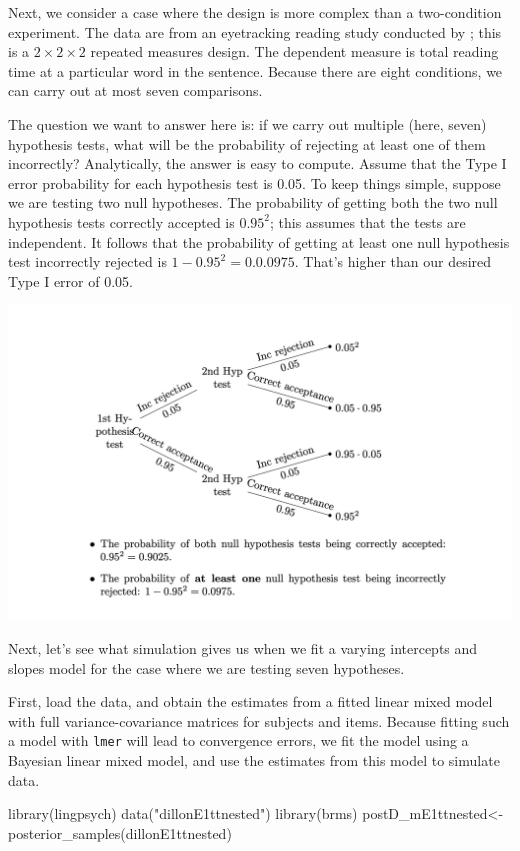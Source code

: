\documentclass[
  12pt,
]{krantz}
\newenvironment{Shaded}{\begin{snugshade}}{\end{snugshade}}
\newcommand{\FunctionTok}[1]{\textcolor[rgb]{0.00,0.00,0.00}{#1}}
\newcommand{\NormalTok}[1]{#1}
\newcommand{\OtherTok}[1]{\textcolor[rgb]{0.56,0.35,0.01}{#1}}
\newcommand{\StringTok}[1]{\textcolor[rgb]{0.31,0.60,0.02}{#1}}
\theoremstyle{definition}
\theoremstyle{definition}
\theoremstyle{definition}
\theoremstyle{definition}
\theoremstyle{remark}
\begin{document}
Next, we consider a case where the design is more complex than a two-condition experiment. The data are from an eyetracking reading study conducted by \citet{Dillon-EtAl-2013}; this is a \(2\times 2 \times 2\) repeated measures design. The dependent measure is total reading time at a particular word in the sentence. Because there are eight conditions, we can carry out at most seven comparisons.

The question we want to answer here is: if we carry out multiple (here, seven) hypothesis tests, what will be the probability of rejecting at least one of them incorrectly? Analytically, the answer is easy to compute. Assume that the Type I error probability for each hypothesis test is 0.05. To keep things simple, suppose we are testing two null hypotheses. The probability of getting both the two null hypothesis tests correctly accepted is \(0.95^2\); this assumes that the tests are independent. It follows that the probability of getting at least one null hypothesis test incorrectly rejected is \(1-0.95^2=0.0.0975\). That's higher than our desired Type I error of 0.05.

\includegraphics{figures/probspace.png}

Next, let's see what simulation gives us when we fit a varying intercepts and slopes model for the case where we are testing seven hypotheses.

First, load the data, and obtain the estimates from a fitted linear mixed model with full variance-covariance matrices for subjects and items. Because fitting such a model with \texttt{lmer} will lead to convergence errors, we fit the model using a Bayesian linear mixed model, and use the estimates from this model to simulate data.

\begin{Shaded}
\begin{Highlighting}[]
\FunctionTok{library}\NormalTok{(lingpsych)}
\FunctionTok{data}\NormalTok{(}\StringTok{"dillonE1ttnested"}\NormalTok{)}
\FunctionTok{library}\NormalTok{(brms)}
\NormalTok{postD\_mE1ttnested}\OtherTok{\textless{}{-}}\FunctionTok{posterior\_samples}\NormalTok{(dillonE1ttnested)}
\end{Highlighting}
\end{Shaded}
\end{document}
